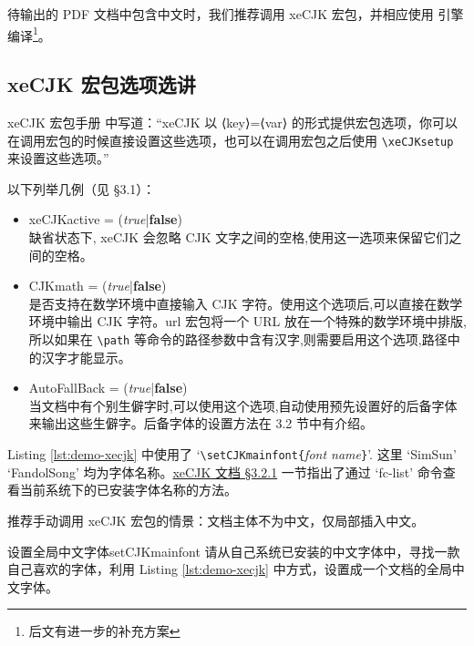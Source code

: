 待输出的 PDF 文档中包含中文时，我们推荐调用 xeCJK 宏包，并相应使用  引擎编译\footnote{后文有进一步的补充方案}。

\subsection{xeCJK 宏包选项选讲}
xeCJK 宏包手册 \cite{xecjk} 中写道：“xeCJK 以 ⟨key⟩=⟨var⟩ 的形式提供宏包选项，你可以在调用宏包的时候直接设置这些选项，也可以在调用宏包之后使用 \verb|\xeCJKsetup| 来设置这些选项。”

以下列举几例（见 \cite{xecjk} \S 3.1）：
\begin{itemize}
\item xeCJKactive = (\textit{true}|\textbf{false}) \\
缺省状态下, xeCJK 会忽略 CJK 文字之间的空格,使用这一选项来保留它们之间的空格。
\item CJKmath = (\textit{true}|\textbf{false}) \\
是否支持在数学环境中直接输入 CJK 字符。使用这个选项后,可以直接在数学环境中输出
CJK 字符。url 宏包将一个 URL 放在一个特殊的数学环境中排版,所以如果在 \verb|\path| 等命令的路径参数中含有汉字,则需要启用这个选项,路径中的汉字才能显示。
\item AutoFallBack = (\textit{true}|\textbf{false}) \\
当文档中有个别生僻字时,可以使用这个选项,自动使用预先设置好的后备字体来输出这些生僻字。后备字体的设置方法在 3.2 节中有介绍。
\end{itemize}

Listing \ref{lst:demo-xecjk} 中使用了 `\verb|\setCJKmainfont{|\textit{font name}\verb|}|'. 这里 `SimSun' `FandolSong' 均为字体名称。\href{http://mirrors.ctan.org/macros/xetex/latex/xecjk/xeCJK.pdf#6}{xeCJK 文档 \S 3.2.1} 一节指出了通过 `fc-list' 命令查看当前系统下的已安装字体名称的方法。

推荐手动调用 xeCJK 宏包的情景：文档主体不为中文，仅局部插入中文。

\begin{Ex}{设置全局中文字体}{setCJKmainfont}
请从自己系统已安装的中文字体中，寻找一款自己喜欢的字体，利用 Listing \ref{lst:demo-xecjk} 中方式，设置成一个文档的全局中文字体。
\end{Ex}